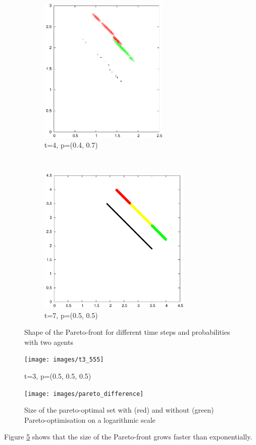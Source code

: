 \documentclass{article}
\begin{document}
\begin{figure}
		\begin{subfigure}[b]{0.45\textwidth}
			\centering
			\includegraphics[width=\textwidth,height=7cm,keepaspectratio]{images/t4_47}
			\caption{t=4, p=(0.4, 0.7)}
			\label{fig:t4_47}
		\end{subfigure}
		~
		\begin{subfigure}[b]{0.45\textwidth}
			\centering
			\includegraphics[width=\textwidth,height=7cm,keepaspectratio]{images/t7_55}
			\caption{t=7, p=(0.5, 0.5)}
			\label{fig:t7_55}
		\end{subfigure}
		\caption{Shape of the Pareto-front for different time steps and
		probabilities with two agents}
		\label{fig:many_fronts}
	\end{figure}

	\begin{figure}
		\centering
		\texttt{[image: images/t3\_555]}
		\label{fig:t3_555}
		\caption{t=3, p=(0.5, 0.5, 0.5)}
	\end{figure}

	\begin{figure}
		\centering
		\caption{Size of the pareto-optimal set with (red) and without (green)
		Pareto-optimisation on a logarithmic scale}
		\texttt{[image: images/pareto\_difference]}
	   \label{fig:pareto_difference}
	\end{figure}
	Figure \ref{fig:pareto_difference} shows that the size of the Pareto-front
	grows faster than exponentially. %
	\restoregeometry
\end{document}
